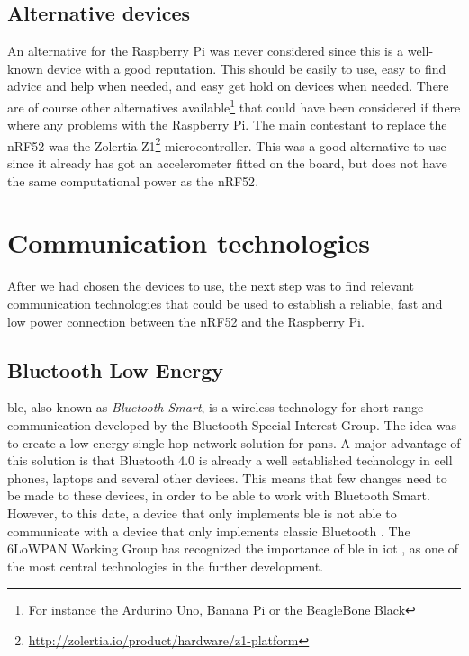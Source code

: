 \subsection{Alternative devices}

An alternative for the Raspberry Pi was never considered since this is a well-known device with a good reputation. This should be easily to use, easy to find advice and help when needed, and easy get hold on devices when needed. There are of course other alternatives available\footnote{For instance the Ardurino Uno, Banana Pi or the BeagleBone Black} that could have been considered if there where any problems with the Raspberry Pi. The main contestant to replace the nRF52 was the Zolertia Z1\footnote{\url{http://zolertia.io/product/hardware/z1-platform}} microcontroller. This was a good alternative to use since it already has got an accelerometer fitted on the board, but does not have the same computational power as the \gls{nRF52}. 



\section{Communication technologies}

\noindent After we had chosen the devices to use, the next step was to find relevant communication technologies that could be used to establish a reliable, fast and low power connection between the \gls{nRF52} and the \gls{Raspberry Pi}. 

\subsection{Bluetooth Low Energy}

\noindent \gls{ble}, also known as \textit{Bluetooth Smart}, is a wireless technology for short-range communication developed by the Bluetooth Special Interest Group. The idea was to create a low energy single-hop network solution for \glspl{pan}. A major advantage of this solution is that Bluetooth 4.0 is already a well established technology in cell phones, laptops and several other devices. This means that few changes need to be made to these devices, in order to be able to work with Bluetooth Smart. However, to this date, a device that only implements \gls{ble} is not able to communicate with a device that only implements classic Bluetooth \cite{gomez2012overview}.
The 6LoWPAN Working Group has recognized the importance of \gls{ble} in \gls{iot} \cite{hui2008extending}, as one of the most central technologies in the further development. %


